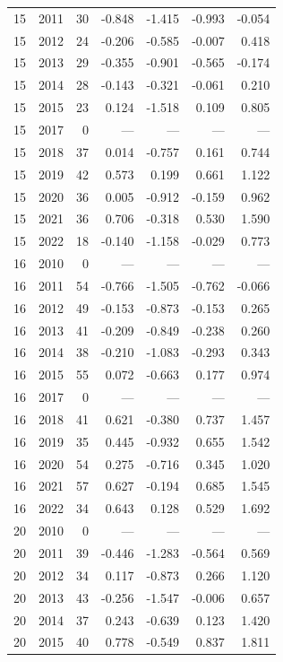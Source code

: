 \begin{longtable}{llrrrrr}
15 & 2011 & 30 & -0.848 & -1.415 & -0.993 & -0.054 \\
15 & 2012 & 24 & -0.206 & -0.585 & -0.007 & 0.418 \\
15 & 2013 & 29 & -0.355 & -0.901 & -0.565 & -0.174 \\
15 & 2014 & 28 & -0.143 & -0.321 & -0.061 & 0.210 \\
15 & 2015 & 23 & 0.124 & -1.518 & 0.109 & 0.805 \\
15 & 2017 & 0 & --- & --- & --- & --- \\
15 & 2018 & 37 & 0.014 & -0.757 & 0.161 & 0.744 \\
15 & 2019 & 42 & 0.573 & 0.199 & 0.661 & 1.122 \\
15 & 2020 & 36 & 0.005 & -0.912 & -0.159 & 0.962 \\
15 & 2021 & 36 & 0.706 & -0.318 & 0.530 & 1.590 \\
15 & 2022 & 18 & -0.140 & -1.158 & -0.029 & 0.773 \\
16 & 2010 & 0 & --- & --- & --- & --- \\
16 & 2011 & 54 & -0.766 & -1.505 & -0.762 & -0.066 \\
16 & 2012 & 49 & -0.153 & -0.873 & -0.153 & 0.265 \\
16 & 2013 & 41 & -0.209 & -0.849 & -0.238 & 0.260 \\
16 & 2014 & 38 & -0.210 & -1.083 & -0.293 & 0.343 \\
16 & 2015 & 55 & 0.072 & -0.663 & 0.177 & 0.974 \\
16 & 2017 & 0 & --- & --- & --- & --- \\
16 & 2018 & 41 & 0.621 & -0.380 & 0.737 & 1.457 \\
16 & 2019 & 35 & 0.445 & -0.932 & 0.655 & 1.542 \\
16 & 2020 & 54 & 0.275 & -0.716 & 0.345 & 1.020 \\
16 & 2021 & 57 & 0.627 & -0.194 & 0.685 & 1.545 \\
16 & 2022 & 34 & 0.643 & 0.128 & 0.529 & 1.692 \\
20 & 2010 & 0 & --- & --- & --- & --- \\
20 & 2011 & 39 & -0.446 & -1.283 & -0.564 & 0.569 \\
20 & 2012 & 34 & 0.117 & -0.873 & 0.266 & 1.120 \\
20 & 2013 & 43 & -0.256 & -1.547 & -0.006 & 0.657 \\
20 & 2014 & 37 & 0.243 & -0.639 & 0.123 & 1.420 \\
20 & 2015 & 40 & 0.778 & -0.549 & 0.837 & 1.811 \\

\end{longtable}
